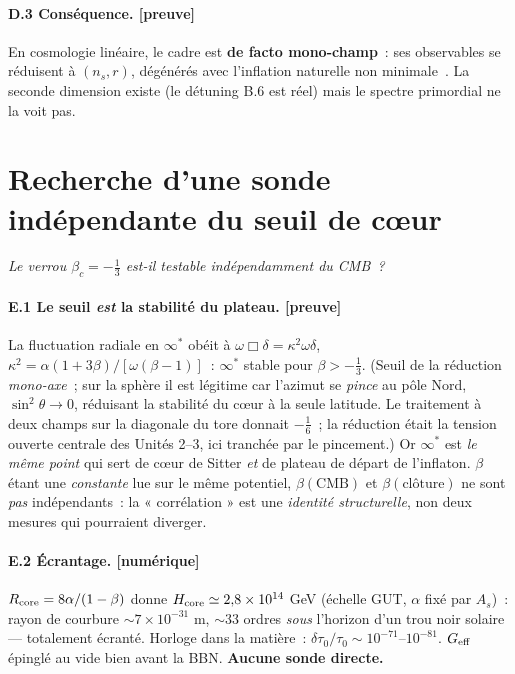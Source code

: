 \documentclass[11pt]{article}
\newcommand{\preuve}{{\small\textbf{[preuve]}}}
\newcommand{\num}{{\small\textbf{[num\'erique]}}}
\theoremstyle{definition}
\begin{document}
\paragraph{D.3 Cons\'equence. \preuve}
En cosmologie lin\'eaire, le cadre est \textbf{de facto mono-champ}~: ses observables se r\'eduisent \`a
$(n_s,r)$, d\'eg\'en\'er\'es avec l'inflation naturelle non minimale~\cite{FreeseFriemanOlinto1990,FerreiraNotariSimeon2018,Simeon2020}. La seconde dimension existe (le
d\'etuning B.6 est r\'eel) mais le spectre primordial ne la voit pas.

\section{Recherche d'une sonde ind\'ependante du seuil de c\oe ur}\label{ann:E}
\emph{Le verrou $\beta_c=-\tfrac13$ est-il testable ind\'ependamment du CMB~?}

\paragraph{E.1 Le seuil \emph{est} la stabilit\'e du plateau. \preuve}
La fluctuation radiale en $\infty^\ast$ ob\'eit \`a $\omega\Box\delta=\kappa^2\omega\delta$,
$\kappa^2=\alpha(1+3\beta)/[\omega(\beta-1)]$~: $\infty^\ast$ stable pour $\beta>-\tfrac13$. (Seuil de
la r\'eduction \emph{mono-axe}~; sur la sph\`ere il est l\'egitime car l'azimut se \emph{pince} au p\^ole
Nord, $\sin^2\!\theta\to0$, r\'eduisant la stabilit\'e du c\oe ur \`a la seule latitude. Le traitement \`a
deux champs sur la diagonale du tore donnait $-\tfrac16$~; la r\'eduction \'etait la tension ouverte
centrale des Unit\'es 2--3, ici tranch\'ee par le pincement.) Or $\infty^\ast$ est \emph{le m\^eme point}
qui sert de c\oe ur de Sitter \emph{et} de plateau de d\'epart de l'inflaton. $\beta$ \'etant une \emph{constante} lue sur le m\^eme potentiel, $\beta(\text{CMB})$ et
$\beta(\text{cl\^oture})$ ne sont \emph{pas} ind\'ependants~: la « corr\'elation » est une \emph{identit\'e
structurelle}, non deux mesures qui pourraient diverger.

\paragraph{E.2 \'Ecrantage. \num}
$R_{\rm core}=8\alpha/(1-\beta)$ donne $H_{\rm core}\simeq2{,}8\times10^{14}$ GeV (\'echelle GUT, $\alpha$
fix\'e par $A_s$)~: rayon de courbure $\sim7\times10^{-31}$ m, $\sim33$ ordres \emph{sous} l'horizon d'un
trou noir solaire --- totalement \'ecrant\'e. Horloge dans la mati\`ere~: $\delta\tau_0/\tau_0\sim
10^{-71}$--$10^{-81}$. $G_{\rm eff}$ \'epingl\'e au vide bien avant la BBN. \textbf{Aucune sonde directe.}
\end{document}
